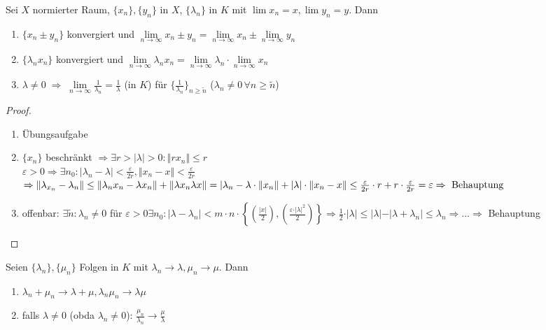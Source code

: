 \begin{proposition}
	Sei $X$ normierter Raum, $\{x_n\}, \{y_n\}$ in $X$, $\{\lambda_n\}$ in $K$ mit $\lim x_n = x, \lim y_n = y$. Dann
	\begin{enumerate}[label={\arabic*)}]
		\item $\{x_n \pm y_n\}$ konvergiert und $\lim\limits_{n\rightarrow\infty}x_n \pm y_n = \lim\limits_{n\rightarrow\infty} x_n \pm \lim\limits_{n\rightarrow\infty} y_n$
		\item $\{\lambda_n x_n\}$ konvergiert und $\lim\limits_{n\rightarrow\infty} \lambda_n x_n = \lim\limits_{n\rightarrow\infty} \lambda_n \cdot \lim\limits_{n\rightarrow\infty}x_n$
		\item $\lambda\neq 0 \;\Rightarrow\;\lim\limits_{n\rightarrow\infty} \frac{1}{\lambda_n} = \frac{1}{\lambda}$ (in $K$) für $\{\frac{1}{\lambda_n}\}_{n\ge\tilde{n}}$ ($\lambda_n\neq 0\,\forall n\ge\tilde{n}$)
	\end{enumerate}
\end{proposition}
\begin{proof}
	\begin{enumerate}
		\item Übungsaufgabe
		\item $\{x_n\}$ beschränkt $\Rightarrow\exists r>\vert\lambda\vert>0:\Vert rx_n\Vert\le r$\\
		$\varepsilon>0\Rightarrow\exists n_0:\vert \lambda_n-\lambda\vert<\frac{\varepsilon}{2r},\Vert x_n-x\Vert < \frac{\varepsilon}{2r}$ \\
		$\Rightarrow \Vert \lambda_{x_n}-\lambda_n\Vert\le \Vert\lambda_nx_n-\lambda x_n\Vert+\Vert\lambda x_n\lambda x\Vert=\vert\lambda_n-\lambda\cdot\Vert x_n\Vert+\vert\lambda\vert\cdot\Vert x_n-x\Vert\le \frac{\varepsilon}{2r}\cdot r+r\cdot\frac{\varepsilon}{2r}=\varepsilon\Rightarrow \text{ Behauptung}$
		\item offenbar: $\exists\tilde n:\lambda_n\neq 0$ für $\varepsilon>0\exists n_0:\vert\lambda-\lambda_n\vert<m\cdot n\cdot \left\lbrace \left(\frac{\vert x\vert}{2}\right),\left(\frac{\varepsilon\cdot\vert\lambda\vert^2}{2}\right)\right\rbrace\Rightarrow\frac{1}{2}\cdot\vert\lambda\vert\le \vert\lambda\vert-\vert\lambda+\lambda_n\vert\le \lambda_n\Rightarrow ... \Rightarrow$ Behauptung
	\end{enumerate}
\end{proof}

\begin{conclusion}
	Seien $\{\lambda_n\}, \{\mu_n\}$ Folgen in $K$ mit $\lambda_n\rightarrow\lambda,\mu_n\rightarrow\mu$. Dann
	\begin{enumerate}[label={\arabic*)}]
		\item $\lambda_n + \mu_n\rightarrow \lambda + \mu, \lambda_n \mu_n\rightarrow\lambda \mu$
		\item falls $\lambda\neq 0$ (\gls{obda} $\lambda_n\neq 0$): $\frac{\mu_n}{\lambda_n}\rightarrow\frac{\mu}{\lambda}$
	\end{enumerate}
\end{conclusion}

